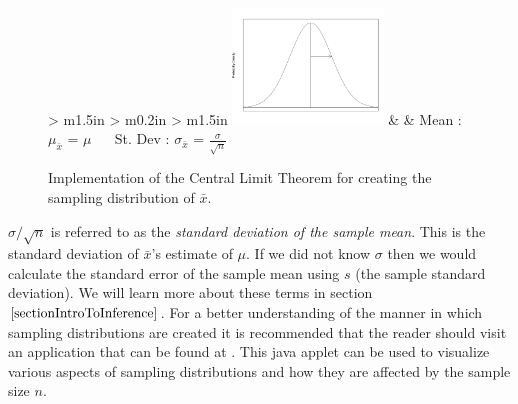 \begin{figure}[H]


\begin{center}
\hspace*{5.5cm}
\begin{tabular}{	> {}m{1.5in} 
  				> {\arraybackslash}m{0.2in} 
				> {\flushleft}m{1.5in} }
		\includegraphics[width=4.00cm]{Section5/dist_x_bar.pdf}  
	&
    	&	Mean : $\mu_{\bar{x}}$  =  $\mu$ \hspace{1in}
		~\hspace*{10in}~
		St. Dev	: $\sigma_{\bar{x}}$	=  $\displaystyle\frac{\sigma}{\sqrt{n} }$\\
\end{tabular}
\end{center}

\vspace*{-0.75cm}
\caption{Implementation of the Central Limit Theorem for creating the 
		sampling distribution of $\bar{x}$.}

\end{figure}







$\sigma / \sqrt{n}$ is referred to as the \textit{standard deviation of the sample mean}. This is the standard deviation of $\bar{x}$'s estimate of $\mu$. If we did not know $\sigma$ then we would calculate the standard error of the sample mean using $s$ (the sample standard deviation). We will learn more about these terms in section $\ref{sectionIntroToInference}$. For a better understanding of the manner in which sampling distributions are created it is recommended that the reader should visit an application that can be found at {\em{}}. This java applet can be used to visualize various aspects of sampling distributions and how they are affected by the sample size $n$.


